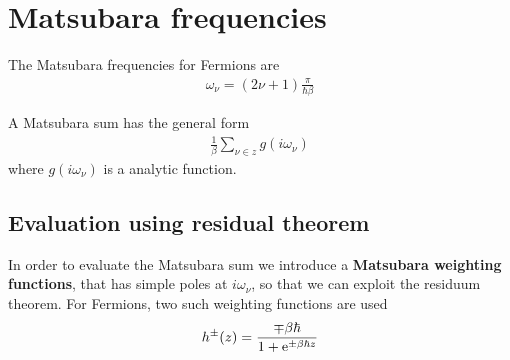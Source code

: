 \documentclass[11pt,a4paper]{report}
\begin{document}
\appendix
\chapter{Matsubara frequencies}
\label{app:matsubarafreq}

The Matsubara frequencies for Fermions are
\begin{eqnarray*}
\omega_\nu=(2\nu+1)\frac{\pi}{\hbar\beta}
\end{eqnarray*}

A Matsubara sum has the general form
\begin{eqnarray*}
\frac{1}{\beta}\sum_{\nu\in z} g(i\omega_\nu)
\end{eqnarray*}
where $g(i\omega_\nu)$ is a analytic function.

\section{Evaluation using residual theorem}
In order to evaluate the Matsubara sum we introduce a
\textbf{Matsubara weighting functions}, that has simple poles at $i\omega_\nu$, so that we can
exploit the residuum theorem. For Fermions, two such weighting
functions are used
\begin{eqnarray}
h^\pm(z)=\frac{\mp\beta\hbar}{1+\mathrm{e}^{\pm\beta\hbar z}}
\end{eqnarray}
\end{document}
